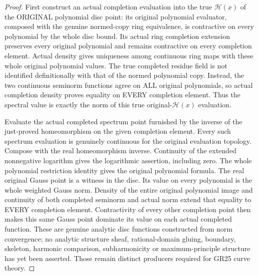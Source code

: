 \begin{proof}
First construct an actual completion evaluation into the true
$\mathcal H(x)$ of the ORIGINAL polynomial disc point: its original
polynomial evaluator, composed with the genuine normed-copy ring
equivalence, is contractive on every polynomial by the whole disc
bound. Its actual ring completion extension preserves every original
polynomial and remains contractive on every completion element.
Actual density gives uniqueness among continuous ring maps with
these whole original polynomial values. The true completed residue
field is not identified definitionally with that of the normed
polynomial copy. Instead, the two continuous seminorm functions
agree on ALL original polynomials, so actual completion density
proves equality on EVERY completion element. Thus the spectral
value is exactly the norm of this true original-$\mathcal H(x)$
evaluation.

Evaluate the actual completed spectrum point furnished by the
inverse of the just-proved homeomorphism on the given completion
element. Every such spectrum evaluation is genuinely continuous
for the original evaluation topology. Compose with the real
homeomorphism inverse. Continuity of the extended nonnegative
logarithm gives the logarithmic assertion, including zero.
The whole polynomial restriction identity gives the original
polynomial formula. The real original Gauss point is a witness in
the disc. Its value on every polynomial is the whole weighted
Gauss norm. Density of the entire original polynomial image and
continuity of both completed seminorm and actual norm extend that
equality to EVERY completion element. Contractivity of every other
completion point then makes this same Gauss point dominate its
value on each actual completed function. These are genuine analytic disc functions
constructed from norm convergence; no analytic structure sheaf,
rational-domain gluing, boundary, skeleton, harmonic comparison,
subharmonicity or maximum-principle structure has yet been asserted.
Those remain distinct producers required for GR25 curve theory.
\end{proof}
